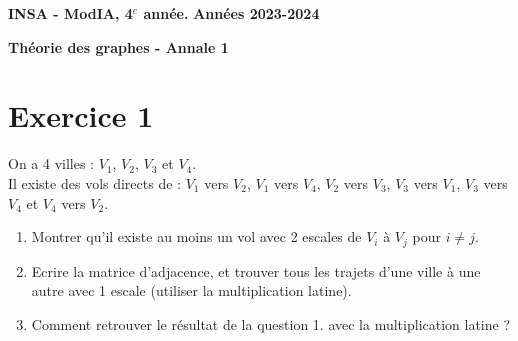 \documentclass[12pt,a4paper]{article}
\newcommand{\entete}{
    \noindent\textbf{INSA - ModIA, 4$^e$ année.}
    \hfill \textbf{Années 2023-2024}
    
    \begin{center}
        \textbf{\LARGE Théorie des graphes - Annale 1}
    \end{center}
}
\begin{document}
\entete

\vspace{0.5cm}

\section*{Exercice 1}

On a 4 villes : $V_1$, $V_2$, $V_3$ et $V_4$. \\
Il existe des vols directs de : $V_1$ vers $V_2$, $V_1$ vers $V_4$, $V_2$ vers $V_3$, $V_3$ vers $V_1$, $V_3$ vers $V_4$ et $V_4$ vers $V_2$. \\

\begin{enumerate}
    \item Montrer qu'il existe au moins un vol avec 2 escales de $V_i$ à $V_j$ pour $i \neq j$.
    \item Ecrire la matrice d'adjacence, et trouver tous les trajets d'une ville à une autre avec 1 escale (utiliser la multiplication latine).
    \item Comment retrouver le résultat de la question 1. avec la multiplication latine ?
\end{enumerate}


\color{blue}

\end{document}
